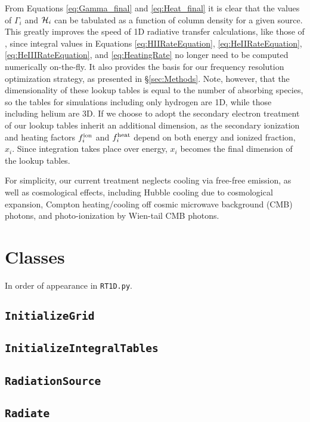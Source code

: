 \documentclass[letterpaper,titlepage,12pt]{article}
\numberwithin{equation}{section}
\begin{document}
From Equations \ref{eq:Gamma_final} and \ref{eq:Heat_final} it is clear that
the values of $\Gamma_i$ and $\mathcal{H}_i$ can be tabulated as a function of
column density for a given source. This greatly improves the speed of 1D
radiative transfer calculations, like those of \cite{Thomas2008}, since
integral values in Equations \ref{eq:HIIRateEquation},
\ref{eq:HeIIRateEquation}, \ref{eq:HeIIIRateEquation}, and
\ref{eq:HeatingRate} no longer need to be computed numerically on-the-fly. It
also provides the basis for our frequency resolution optimization strategy, as
presented in \S\ref{sec:Methods}. Note, however, that the dimensionality of
these lookup tables is equal to the number of absorbing species, so the tables
for simulations including only hydrogen are 1D, while those including helium
are 3D. If we choose to adopt the secondary electron treatment of
\cite{Furlanetto2010} our lookup tables inherit an additional dimension, as
the secondary ionization and heating factors $f_i^{\text{ion}}$ and $f_i^{\text{heat}}$ depend on
both energy and ionized fraction, $x_i$. Since integration takes place over
energy, $x_i$ becomes the final dimension of the lookup tables.

For simplicity, our current treatment neglects cooling via free-free emission,
as well as cosmological effects, including Hubble cooling due to cosmological
expansion, Compton heating/cooling off cosmic microwave background (CMB)
photons, and photo-ionization by Wien-tail CMB photons.  


\section{Classes}
In order of appearance in \texttt{RT1D.py}.

\subsection{\texttt{InitializeGrid}}
\subsection{\texttt{InitializeIntegralTables}}
\subsection{\texttt{RadiationSource}}
\subsection{\texttt{Radiate}}
\end{document}
